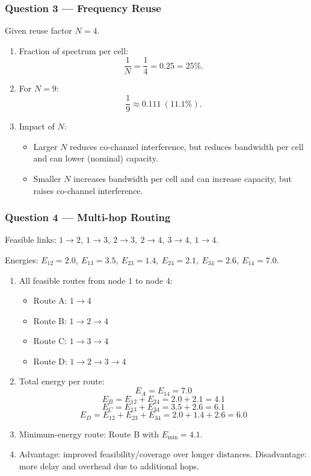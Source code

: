\documentclass[11pt,a4paper]{article}
\begin{document}
\subsubsection*{Question 3 --- Frequency Reuse}
Given reuse factor $N=4$.

\begin{enumerate}[label=\alph*.]
    \item Fraction of spectrum per cell:
    \[
    \frac{1}{N}=\frac{1}{4}=0.25=25\%.
    \]
    \item For $N=9$:
    \[
    \frac{1}{9}\approx 0.111\ (11.1\%).
    \]
    \item Impact of $N$:
    \begin{itemize}
        \item Larger $N$ reduces co-channel interference, but reduces bandwidth per cell and can lower (nominal) capacity.
        \item Smaller $N$ increases bandwidth per cell and can increase capacity, but raises co-channel interference.
    \end{itemize}
    
\end{enumerate}

\subsubsection*{Question 4 --- Multi-hop Routing}
Feasible links: $1\to 2,\ 1\to 3,\ 2\to 3,\ 2\to 4,\ 3\to 4,\ 1\to 4$.

Energies: $E_{12}=2.0,\ E_{13}=3.5,\ E_{23}=1.4,\ E_{24}=2.1,\ E_{34}=2.6,\ E_{14}=7.0$.

\begin{enumerate}[label=\alph*.]
    \item All feasible routes from node $1$ to node $4$:
    \begin{itemize}
        \item Route A: $1\to 4$
        \item Route B: $1\to 2\to 4$
        \item Route C: $1\to 3\to 4$
        \item Route D: $1\to 2\to 3\to 4$
    \end{itemize}
    \item Total energy per route:
    \[
    E_A=E_{14}=7.0
    \]
    \[
    E_B=E_{12}+E_{24}=2.0+2.1=4.1
    \]
    \[
    E_C=E_{13}+E_{34}=3.5+2.6=6.1
    \]
    \[
    E_D=E_{12}+E_{23}+E_{34}=2.0+1.4+2.6=6.0
    \]
    \item Minimum-energy route: Route B with $E_{\min}=4.1$.
    \item Advantage: improved feasibility/coverage over longer distances. Disadvantage: more delay and overhead due to additional hops.
\end{enumerate}
\end{document}
